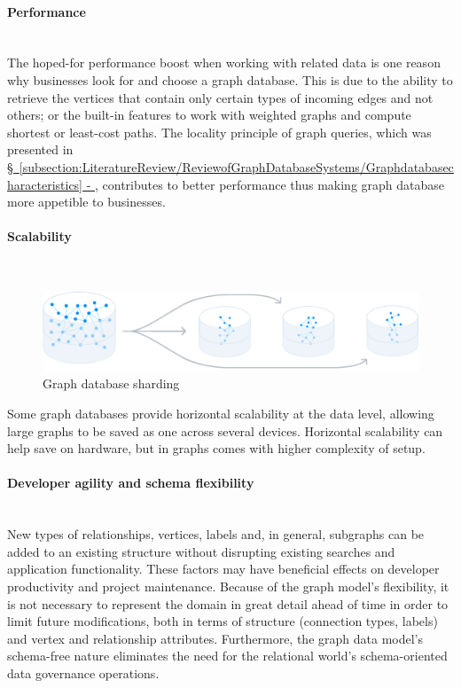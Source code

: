 \paragraph{Performance}\mbox{}\\\indent
The hoped-for performance boost when working with related data is one reason why businesses look for and choose a graph database.
This is due to the ability to retrieve the vertices that contain only certain types of incoming edges and not others;
or the built-in features to work with weighted graphs and compute shortest or least-cost paths.
The locality principle of graph queries, which was presented in \hyperref[subsection:LiteratureReview/ReviewofGraphDatabaseSystems/Graphdatabasecharacteristics]{\S\ \ref{subsection:LiteratureReview/ReviewofGraphDatabaseSystems/Graphdatabasecharacteristics} - }, contributes to better performance thus making graph database more appetible to businesses.
\par
\paragraph{Scalability}\mbox{}\\\indent
\begin{figure}[H]%
	\centering%
	\includegraphics[width=1\textwidth,%
	]{images/chapter2/shardingneo4j.pdf}%
	\caption[Graph database sharding]{Graph database sharding}%
	\label{fig:shardingneo4j}%
\end{figure}%

Some graph databases provide horizontal scalability at the data level, allowing large graphs to be saved as one across several devices.
Horizontal scalability can help save on hardware, but in graphs comes with higher complexity of setup.
\par
\paragraph{Developer agility and schema flexibility}\mbox{}\\\indent
New types of relationships, vertices, labels and, in general, subgraphs can be added to an existing structure without disrupting existing searches and application functionality.
These factors may have beneficial effects on developer productivity and project maintenance.
Because of the graph model's flexibility, it is not necessary to represent the domain in great detail ahead of time in order to limit future modifications, both in terms of structure (connection types, labels) and vertex and relationship attributes.
Furthermore, the graph data model's schema-free nature eliminates the need for the relational world's schema-oriented data governance operations.

